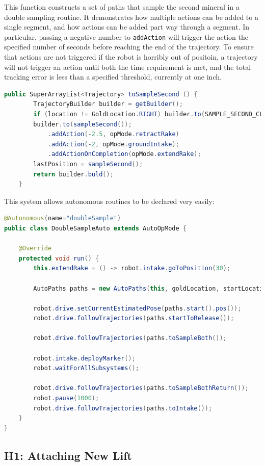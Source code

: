\documentclass{article}
\begin{document}
This function constructs a set of paths that sample the second mineral in a double sampling routine. It demonstrates how multiple actions can be added to a single segment, and how actions can be added part way through a segment. In particular, passing a negative number to \texttt{addAction} will trigger the action the specified number of seconds before reaching the end of the trajectory. To ensure that actions are not triggered if the robot is horribly out of positoin, a trajectory will not trigger an action until both the time requirement is met, and the total tracking error is less than a specified threshold, currently at one inch. 
\begin{lstlisting}[language=Java]
    public SuperArrayList<Trajectory> toSampleSecond () {
        TrajectoryBuilder builder = getBuilder();
        if (location != GoldLocation.RIGHT) builder.to(SAMPLE_SECOND_CLEAR);
        builder.to(sampleSecond());
            .addAction(-2.5, opMode.retractRake)
            .addAction(-2, opMode.groundIntake);
            .addActionOnCompletion(opMode.extendRake);
        lastPosition = sampleSecond();
        return builder.buld();
    }
\end{lstlisting}

This system allows autonomous routines to be declared very easily:
\begin{lstlisting}[language=Java]
@Autonomous(name="doubleSample")
public class DoubleSampleAuto extends AutoOpMode {

    @Override
    protected void run() {
        this.extendRake = () -> robot.intake.goToPosition(30);
        
        AutoPaths paths = new AutoPaths(this, goldLocation, startLocation);
        
        robot.drive.setCurrentEstimatedPose(paths.start().pos());
        robot.drive.followTrajectories(paths.startToRelease());

        robot.drive.followTrajectories(paths.toSampleBoth());
        
        robot.intake.deployMarker();
        robot.waitForAllSubsystems();
        
        robot.drive.followTrajectories(paths.toSampleBothReturn());
        robot.pause(1000);
        robot.drive.followTrajectories(paths.toIntake());
    }
}

\end{lstlisting}
\subsection{H1: Attaching New Lift}
\end{document}

